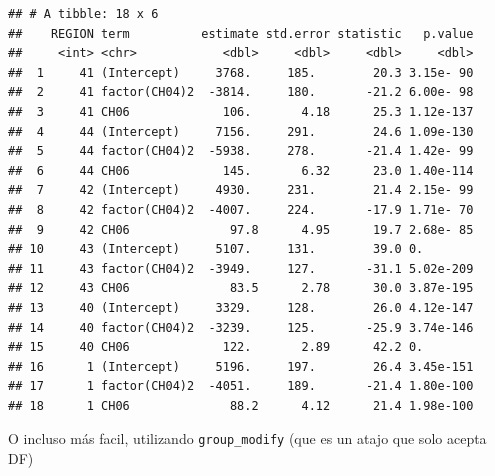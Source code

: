 \documentclass[]{book}
\newenvironment{Shaded}{\begin{snugshade}}{\end{snugshade}}
\newcommand{\KeywordTok}[1]{\textcolor[rgb]{0.13,0.29,0.53}{\textbf{#1}}}
\newcommand{\NormalTok}[1]{#1}
\newcommand{\OperatorTok}[1]{\textcolor[rgb]{0.81,0.36,0.00}{\textbf{#1}}}
\newcommand{\StringTok}[1]{\textcolor[rgb]{0.31,0.60,0.02}{#1}}
\begin{document}
\begin{verbatim}
## # A tibble: 18 x 6
##    REGION term          estimate std.error statistic   p.value
##     <int> <chr>            <dbl>     <dbl>     <dbl>     <dbl>
##  1     41 (Intercept)     3768.     185.        20.3 3.15e- 90
##  2     41 factor(CH04)2  -3814.     180.       -21.2 6.00e- 98
##  3     41 CH06             106.       4.18      25.3 1.12e-137
##  4     44 (Intercept)     7156.     291.        24.6 1.09e-130
##  5     44 factor(CH04)2  -5938.     278.       -21.4 1.42e- 99
##  6     44 CH06             145.       6.32      23.0 1.40e-114
##  7     42 (Intercept)     4930.     231.        21.4 2.15e- 99
##  8     42 factor(CH04)2  -4007.     224.       -17.9 1.71e- 70
##  9     42 CH06              97.8      4.95      19.7 2.68e- 85
## 10     43 (Intercept)     5107.     131.        39.0 0.       
## 11     43 factor(CH04)2  -3949.     127.       -31.1 5.02e-209
## 12     43 CH06              83.5      2.78      30.0 3.87e-195
## 13     40 (Intercept)     3329.     128.        26.0 4.12e-147
## 14     40 factor(CH04)2  -3239.     125.       -25.9 3.74e-146
## 15     40 CH06             122.       2.89      42.2 0.       
## 16      1 (Intercept)     5196.     197.        26.4 3.45e-151
## 17      1 factor(CH04)2  -4051.     189.       -21.4 1.80e-100
## 18      1 CH06              88.2      4.12      21.4 1.98e-100
\end{verbatim}

O incluso más facil, utilizando \texttt{group\_modify} (que es un atajo que solo acepta DF)

\begin{Shaded}
\end{Shaded}
\end{document}
